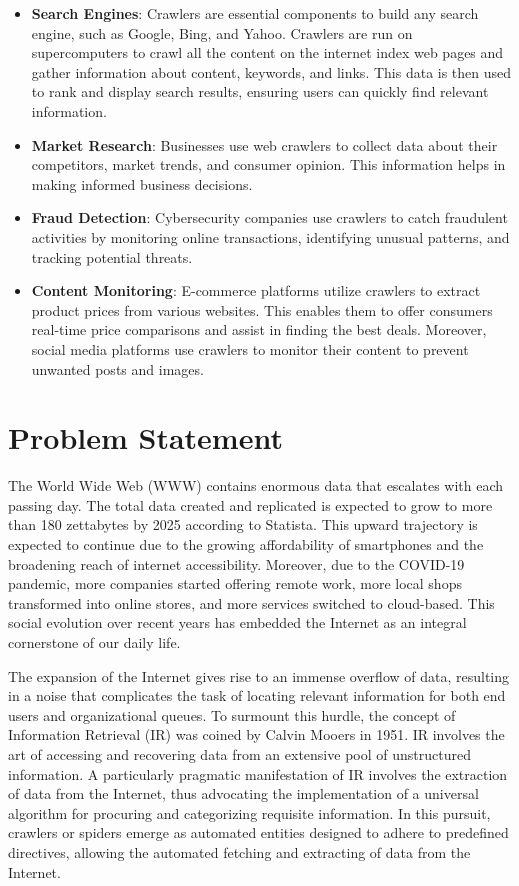 \begin{itemize}
  \item \textbf{Search Engines}: Crawlers are essential components to build any search engine, such as Google, Bing, and Yahoo. Crawlers are run on supercomputers to crawl all the content on the internet index web pages and gather information about content, keywords, and links. This data is then used to rank and display search results, ensuring users can quickly find relevant information.
  \item \textbf{Market Research}: Businesses use web crawlers to collect data about their competitors, market trends, and consumer opinion. This information helps in making informed business decisions.
  \item \textbf{Fraud Detection}: Cybersecurity companies use crawlers to catch fraudulent activities by monitoring online transactions, identifying unusual patterns, and tracking potential threats.
  \item \textbf{Content Monitoring}: E-commerce platforms utilize crawlers to extract product prices from various websites. This enables them to offer consumers real-time price comparisons and assist in finding the best deals. Moreover, social media platforms use crawlers to monitor their content to prevent unwanted posts and images.
\end{itemize}

\section{Problem Statement}

The World Wide Web (WWW) contains enormous data that escalates with each passing day. The total data created and replicated is expected to grow to more than 180 zettabytes by 2025 according to Statista. This upward trajectory is expected to continue due to the growing affordability of smartphones and the broadening reach of internet accessibility. Moreover, due to the COVID-19 pandemic, more companies started offering remote work, more local shops transformed into online stores, and more services switched to cloud-based. This social evolution over recent years has embedded the Internet as an integral cornerstone of our daily life.

The expansion of the Internet gives rise to an immense overflow of data, resulting in a noise that complicates the task of locating relevant information for both end users and organizational queues. To surmount this hurdle, the concept of Information Retrieval (IR) was coined by Calvin Mooers in 1951. IR involves the art of accessing and recovering data from an extensive pool of unstructured information. A particularly pragmatic manifestation of IR involves the extraction of data from the Internet, thus advocating the implementation of a universal algorithm for procuring and categorizing requisite information. In this pursuit, crawlers or spiders emerge as automated entities designed to adhere to predefined directives, allowing the automated fetching and extracting of data from the Internet.

